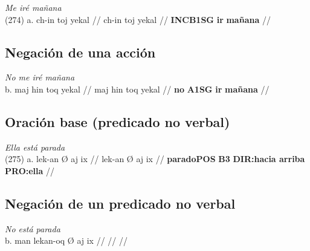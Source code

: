 \documentclass{article}%
\begin{document}
%
\par\medskip%
\ex
\textit{Me iré mañana} \\
\begingl
\gla (274) a. ch-in toj yekal //
\glb ch-in toj yekal //
\glc \textbf{INC}\textbf{B1SG} \textbf{ir} \textbf{mañana} //
\endgl
\xe
%
\medskip%
\subsection{Negación de una acción}%
\label{subsec:Negacindeunaaccin}%

%
\par\medskip%
\ex
\textit{No me iré mañana} \\
\begingl
\gla b. maj hin toq yekal //
\glb maj hin toq yekal //
\glc \textbf{no} \textbf{A1SG} \textbf{ir} \textbf{mañana} //
\endgl
\xe
%
\medskip%
\subsection{Oración base (predicado no verbal)}%
\label{subsec:Oracinbase(predicadonoverbal)}%

%
\par\medskip%
\ex
\textit{Ella está parada} \\
\begingl
\gla (275) a. lek-an Ø aj ix //
\glb lek-an Ø aj ix //
\glc \textbf{parado}\textbf{POS} \textbf{B3} \textbf{DIR:hacia arriba} \textbf{PRO:ella} //
\endgl
\xe
%
\medskip%
\subsection{Negación de un predicado no verbal}%
\label{subsec:Negacindeunpredicadonoverbal}%

%
\par\medskip%
\ex
\textit{No está parada} \\
\begingl
\gla b. man lekan-oq Ø aj ix //
\glb  //
\glc  //
\endgl
\xe
%
\medskip

%
\end{document}

